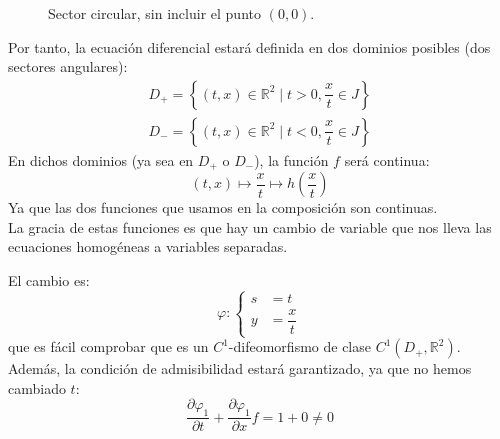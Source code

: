 \begin{figure}[H]
\centering
{}   
\caption{Sector circular, sin incluir el punto $(0,0)$.}
\end{figure}



Por tanto, la ecuación diferencial estará definida en dos dominios posibles (dos sectores angulares):
\begin{gather*}
    D_+ = \left\{(t,x)\in \mathbb{R}^2 \mid t > 0, \dfrac{x}{t}\in J\right\}\\
    D_- = \left\{(t,x)\in \mathbb{R}^2 \mid t < 0, \dfrac{x}{t}\in J\right\}
\end{gather*}
En dichos dominios (ya sea en $D_+$ o $D_-$), la función $f$ será continua:
\begin{equation*}
    (t,x) \mapsto \dfrac{x}{t} \mapsto h\left(\dfrac{x}{t}\right)
\end{equation*}
Ya que las dos funciones que usamos en la composición son continuas.\\

La gracia de estas funciones es que hay un cambio de variable que nos lleva las ecuaciones homogéneas a variables separadas.

El cambio es:
\begin{equation*}
    \varphi : \left\{\begin{array}{rl}
            s &= t \\
            y &= \dfrac{x}{t}
    \end{array}\right.
\end{equation*}
que es fácil comprobar que es un $C^1$-difeomorfismo de clase $C^1(D_+, \mathbb{R}^2)$.
Además, la condición de admisibilidad estará garantizado, ya que no hemos cambiado $t$:
\begin{equation*}
    \dfrac{\partial\varphi_1}{\partial t} + \dfrac{\partial\varphi_1}{\partial x} f = 1 + 0 \neq 0
\end{equation*}

